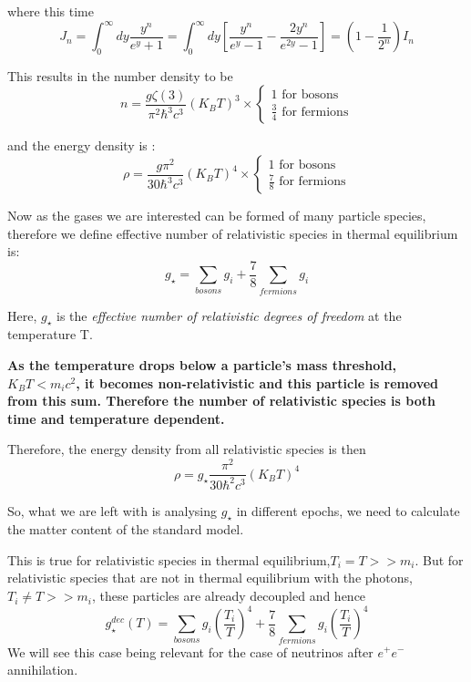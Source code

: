 \documentclass[12pt]{report}
\newcommand{\tbf}[1]{\textbf{#1}}
\newcommand{\tit}[1]{\textit{#1}}
\newcommand{\f}[1]{${#1}$}
\begin{document}
where this time 
\begin{equation}
J_n=\int^\infty_0 dy \frac{y^n}{e^y + 1}= \int^\infty_0 dy \left[\frac{y^n}{e^y-1} - \frac{2y^n}{e^{2y}-1} \right] = \left(1-\frac{1}{2^n}\right)I_n
\end{equation}

This results in the number density to be
\begin{equation}
n=\frac{g \zeta(3)}{\pi^2 \hbar^3 c^3} (K_BT)^3\times \begin{cases}
												1 \text{ for bosons}\\
												\frac{3}{4} \text{ for fermions}
											 \end{cases}
\end{equation} 

and the energy density is :
\begin{equation}
\rho=\frac{g \pi^2}{30 \hbar^3 c^3} (K_BT)^4\times \begin{cases}
												1 \text{ for bosons}\\
												\frac{7}{8} \text{ for fermions}
											 \end{cases}
\end{equation} 

Now as the gases we are interested can be formed of many particle species, therefore we define effective number of relativistic species in thermal equilibrium is:
\begin{equation}
g_\star =\sum _{bosons} g_i + \frac{7}{8} \sum _{fermions} g_i
\end{equation}

Here, $g_\star$ is the \tit{effective number of relativistic degrees of freedom} at the temperature T.

\tbf{As the temperature drops below a particle's mass threshold, $K_BT<m_ic^2$, it becomes non-relativistic and this particle is removed from this sum. Therefore the number of relativistic species is both time and temperature dependent.}

Therefore, the energy density from all relativistic species is then 
\begin{equation}
\rho = g_\star \frac{\pi^2}{30 \hbar^2 c^3} (K_BT)^4
\end{equation}

So, what we are left with is analysing $g_\star$ in different epochs, we need to calculate the matter content of the standard model.

This is true for relativistic species in thermal equilibrium,$T_i=T>>m_i$. But for relativistic species that are not in thermal equilibrium with the photons, $T_i \neq T >> m_i$, these particles are already decoupled and hence
\begin{equation}
g^{dec}_\star(T)= \sum_{bosons} g_i \left(\frac{T_i}{T}\right)^4 +\frac{7}{8}\sum_{fermions} g_i \left(\frac{T_i}{T}\right)^4
\end{equation}
We will see this case being relevant for the case of neutrinos after \f{e^+e^-} annihilation.
\end{document}
